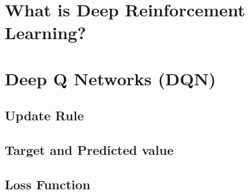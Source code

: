 
\section{What is Deep Reinforcement Learning?}


\section{Deep Q Networks (DQN)}

\subsection{Update Rule}
\subsection{Target and Predicted value}
\subsection{Loss Function}
